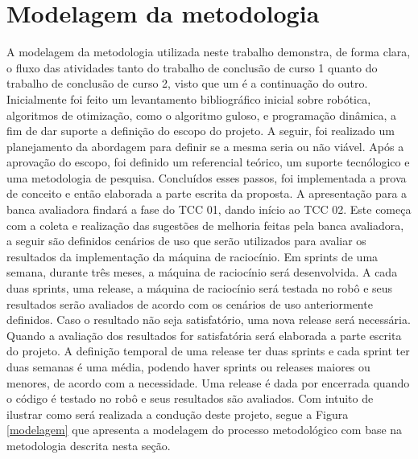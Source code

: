 \section{Modelagem da metodologia}
	A modelagem da metodologia utilizada neste trabalho demonstra, de forma clara, o fluxo das atividades tanto do trabalho de conclusão de curso 1 quanto do trabalho de conclusão de curso 2, visto que um é a continuação do outro.
	Inicialmente foi feito um levantamento bibliográfico inicial sobre robótica, algoritmos de otimização, como o algoritmo guloso, e programação dinâmica, a fim de dar suporte a definição do escopo do projeto. A seguir, foi realizado um planejamento da abordagem para definir se a mesma seria ou não viável. Após a aprovação do escopo, foi definido um referencial teórico, um suporte tecnólogico e uma metodologia de pesquisa. Concluídos esses passos, foi implementada a prova de conceito e então elaborada a parte escrita da proposta. 
	A apresentação para a banca avaliadora findará a fase do TCC 01, dando início ao TCC 02. Este começa com a coleta e realização das sugestões de melhoria feitas pela banca avaliadora, a seguir são definidos cenários de uso que serão utilizados para avaliar os resultados da implementação da máquina de raciocínio. Em sprints de uma semana, durante três meses, a máquina de raciocínio será desenvolvida. A cada duas sprints, uma release, a máquina de raciocínio será testada no robô e seus resultados serão avaliados de acordo com os cenários de uso anteriormente definidos. Caso o resultado não seja satisfatório, uma nova release será necessária. Quando a avaliação dos resultados for satisfatória será elaborada a parte escrita do projeto.
	A definição temporal de uma release ter duas sprints e cada sprint ter duas semanas é uma média, podendo haver sprints ou releases maiores ou menores, de acordo com a necessidade. Uma release é dada por encerrada quando o código é testado no robô e seus resultados são avaliados. 
	Com intuito de ilustrar como será realizada a condução deste projeto, segue a
Figura \ref{modelagem} que apresenta a modelagem do processo metodológico com base na metodologia descrita nesta seção.

